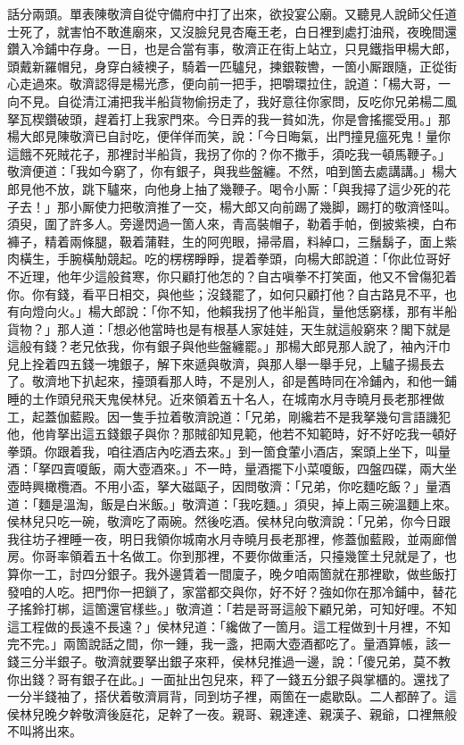 話分兩頭。單表陳敬濟自從守備府中打了出來，欲投宴公廟。又聽見人說師父任道士死了，就害怕不敢進廟來，又沒臉兒見杏庵王老，白日裡到處打油飛，夜晚間還鑽入冷鋪中存身。一日，也是合當有事，敬濟正在街上站立，只見鐵指甲楊大郎，頭戴新羅帽兒，身穿白綾襖子，騎着一匹驢兒，揀銀鞍轡，一箇小厮跟隨，正從街心走過來。敬濟認得是楊光彥，便向前一把手，把嚼環拉住，說道：「楊大哥，一向不見。自從清江浦把我半船貨物偷拐走了，我好意往你家問，反吃你兄弟楊二風拏瓦楔鑽破頭，趕着打上我家門來。今日弄的我一貧如洗，你是會搖擺受用。」那楊大郎見陳敬濟已自討吃，便佯佯而笑，說：「今日晦氣，出門撞見瘟死鬼！量你這餓不死賊花子，那裡討半船貨，我拐了你的？你不撒手，須吃我一頓馬鞭子。」敬濟便道：「我如今窮了，你有銀子，與我些盤纏。不然，咱到箇去處講講。」楊大郎見他不放，跳下驢來，向他身上抽了幾鞭子。喝令小厮：「與我撏了這少死的花子去！」那小厮使力把敬濟推了一交，楊大郎又向前踢了幾脚，踢打的敬濟怪叫。須臾，圍了許多人。旁邊閃過一箇人來，青高裝帽子，勒着手帕，倒披紫襖，白布褲子，精着兩條腿，靸着蒲鞋，生的阿兜眼，掃帚眉，料綽口，三鬚鬍子，面上紫肉橫生，手腕橫觔競起。吃的楞楞睜睜，提着拳頭，向楊大郎說道：「你此位哥好不近理，他年少這般貧寒，你只顧打他怎的？{}自古嗔拳不打笑面，他又不曾傷犯着你。你有錢，看平日相交，與他些；沒錢罷了，如何只顧打他？自古路見不平，也有向燈向火。」楊大郎說：「你不知，他賴我拐了他半船貨，量他恁窮樣，那有半船貨物？」那人道：「想必他當時也是有根基人家娃娃，天生就這般窮來？閣下就是這般有錢？老兄依我，你有銀子與他些盤纏罷。」那楊大郎見那人說了，袖內汗巾兒上拴着四五錢一塊銀子，解下來遞與敬濟，與那人舉一舉手兒，上驢子揚長去了。敬濟地下扒起來，擡頭看那人時，不是別人，卻是舊時同在冷鋪內，和他一鋪睡的土作頭兒飛天鬼侯林兒。近來領着五十名人，在城南水月寺曉月長老那裡做工，起蓋伽藍殿。因一隻手拉着敬濟說道：「兄弟，剛纔若不是我拏幾句言語譏犯他，他肯拏出這五錢銀子與你？那賊卻知見範，他若不知範時，好不好吃我一頓好拳頭。你跟着我，咱往酒店內吃酒去來。」到一箇食葷小酒店，案頭上坐下，叫量酒：「拏四賣嗄飯，兩大壺酒來。」不一時，量酒擺下小菜嗄飯，四盤四碟，兩大坐壺時興橄欖酒。不用小盃，拏大磁甌子，因問敬濟：「兄弟，你吃麵吃飯？」量酒道：「麵是溫淘，飯是白米飯。」敬濟道：「我吃麵。」須臾，掉上兩三碗溫麵上來。侯林兒只吃一碗，敬濟吃了兩碗。然後吃酒。侯林兒向敬濟說：「兄弟，你今日跟我往坊子裡睡一夜，{}明日我領你城南水月寺曉月長老那裡，修蓋伽藍殿，並兩廊僧房。你哥率領着五十名做工。你到那裡，不要你做重活，只擡幾筐土兒就是了，也算你一工，討四分銀子。我外邊賃着一間廈子，晚夕咱兩箇就在那裡歇，{}做些飯打發咱的人吃。把門你一把鎖了，家當都交與你，{}好不好？強如你在那冷鋪中，替花子搖鈴打梆，這箇還官樣些。」敬濟道：「若是哥哥這般下顧兄弟，可知好哩。不知這工程做的長遠不長遠？」侯林兒道：「纔做了一箇月。這工程做到十月裡，不知完不完。」兩箇說話之間，你一鍾，我一盞，把兩大壺酒都吃了。量酒算帳，該一錢三分半銀子。敬濟就要拏出銀子來秤，侯林兒推過一邊，說：「傻兄弟，莫不教你出錢？哥有銀子在此。」一面扯出包兒來，秤了一錢五分銀子與掌櫃的。還找了一分半錢袖了，搭伏着敬濟肩背，同到坊子裡，兩箇在一處歇臥。二人都醉了。這侯林兒晚夕幹敬濟後庭花，足幹了一夜。親哥、親達達、親漢子、親爺，口裡無般不叫將出來。

